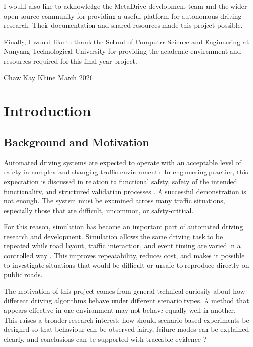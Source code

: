 \documentclass[12pt,a4paper]{report}
\begin{document}
I would also like to acknowledge the MetaDrive development team and the wider open-source community for providing a useful platform for autonomous driving research. Their documentation and shared resources made this project possible.

Finally, I would like to thank the School of Computer Science and Engineering at Nanyang Technological University for providing the academic environment and resources required for this final year project.

\bigskip
\begin{flushright}
Chaw Kay Khine \quad March 2026
\end{flushright}

\tableofcontents
\listoffigures
\listoftables

\clearpage
{}

\chapter{Introduction}

\section{Background and Motivation}
Automated driving systems are expected to operate with an acceptable level of safety in complex and changing traffic environments. In engineering practice, this expectation is discussed in relation to functional safety, safety of the intended functionality, and structured validation processes \cite{iso26262,iso21448,sae3016,unece_natm}. A successful demonstration is not enough. The system must be examined across many traffic situations, especially those that are difficult, uncommon, or safety-critical.

For this reason, simulation has become an important part of automated driving research and development. Simulation allows the same driving task to be repeated while road layout, traffic interaction, and event timing are varied in a controlled way \cite{wang2024scenario,zhang2024virtual,skoglund2025safety}. This improves repeatability, reduces cost, and makes it possible to investigate situations that would be difficult or unsafe to reproduce directly on public roads.

The motivation of this project comes from general technical curiosity about how different driving algorithms behave under different scenario types. A method that appears effective in one environment may not behave equally well in another. This raises a broader research interest: how should scenario-based experiments be designed so that behaviour can be observed fairly, failure modes can be explained clearly, and conclusions can be supported with traceable evidence \cite{wang2024scenario,song2023critical}?
\end{document}
